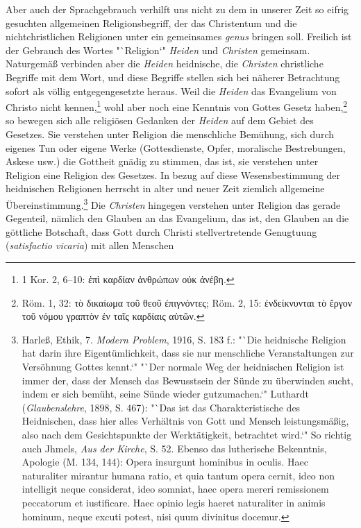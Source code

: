 Aber auch der Sprachgebrauch verhilft uns nicht zu dem in unserer Zeit so eifrig gesuchten allgemeinen Religionsbegriff, der das Christentum und die nichtchristlichen Religionen unter ein gemeinsames \emph{genus} bringen soll. Freilich ist der Gebrauch des Wortes "`Religion`" \emph{Heiden} und \emph{Christen} gemeinsam. Naturgemäß verbinden aber die \emph{Heiden} heidnische, die \emph{Christen} christliche Begriffe mit dem Wort, und diese Begriffe stellen sich bei näherer Betrachtung sofort als völlig entgegengesetzte heraus. Weil die \emph{Heiden} das Evangelium von Christo nicht kennen,\footnote{1 Kor. 2, 6--10: ἐπὶ καρδίαν ἀνθρώπων οὐκ ἀνέβη.} wohl aber noch eine Kenntnis von Gottes Gesetz haben,\footnote{Röm. 1, 32: τὸ δικαίωμα τοῦ θεοῦ ἐπιγνόντες; Röm. 2, 15: ἐνδείκνυνται τὸ ἔργον τοῦ νόμου γραπτὸν ἐν ταῖς καρδίαις αὐτῶν.} so bewegen sich alle religiösen Gedanken der \emph{Heiden} auf dem Gebiet des Gesetzes. Sie verstehen unter Religion die menschliche Bemühung, sich durch eigenes Tun oder eigene Werke (Gottesdienste, Opfer, moralische Bestrebungen, Askese usw.) die Gottheit gnädig zu stimmen, das ist, sie verstehen unter Religion eine Religion des Gesetzes. In bezug auf diese Wesensbestimmung der heidnischen Religionen herrscht in alter und neuer Zeit ziemlich allgemeine Übereinstimmung.\footnote{Harleß, Ethik, 7. \emph{Modern Problem}, 1916, S. 183 f.: "`Die heidnische Religion hat darin ihre Eigentümlichkeit, dass sie nur menschliche Veranstaltungen zur Versöhnung Gottes kennt.`" "`Der normale Weg der heidnischen Religion ist immer der, dass der Mensch das Bewusstsein der Sünde zu überwinden sucht, indem er sich bemüht, seine Sünde wieder gutzumachen.`" Luthardt (\emph{Glaubenslehre}, 1898, S. 467): "`Das ist das Charakteristische des Heidnischen, dass hier alles Verhältnis von Gott und Mensch leistungsmäßig, also nach dem Gesichtspunkte der Werktätigkeit, betrachtet wird.`" So richtig auch Jhmels, \emph{Aus der Kirche}, S. 52. Ebenso das lutherische Bekenntnis, Apologie (M. 134, 144): Opera insurgunt hominibus in oculis. Haec naturaliter mirantur humana ratio, et quia tantum opera cernit, ideo non intelligit neque considerat, ideo somniat, haec opera mereri remissionem peccatorum et iustificare. Haec opinio legis haeret naturaliter in animis hominum, neque excuti potest, nisi quum divinitus docemur.} Die \emph{Christen} hingegen verstehen unter Religion das gerade Gegenteil, nämlich den Glauben an das Evangelium, das ist, den Glauben an die göttliche Botschaft, dass Gott durch Christi stellvertretende Genugtuung (\emph{satisfactio vicaria}) mit allen Menschen